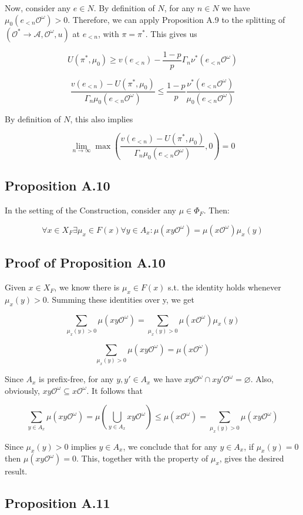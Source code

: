 \documentclass[a4paper]{article}
\newcommand{\Act}{\mathcal{A}}
\newcommand{\Obs}{\mathcal{O}}
\newcommand{\ObsO}{\Obs^\omega}
\newcommand{\Pol}{\Obs^* \rightarrow \Act}
\begin{document}
Now, consider any ${e \in N}$. By definition of ${N}$, for any ${n \in N}$ we have ${\mu_0(e_{<n}\ObsO) > 0}$. Therefore, we can apply Proposition A.9 to the splitting of ${(\Pol,\ObsO,u)}$ at ${e_{<n}}$, with ${\pi = \pi^*}$. This gives us

$$U(\pi^*,\mu_0) \geq v(e_{<n})-\frac{1-p}{p} \Gamma_n \nu^*(e_{<n}\ObsO)$$

$$\frac{v(e_{<n}) - U(\pi^*,\mu_0)}{\Gamma_n\mu_0(e_{<n}\ObsO)} \leq \frac{1-p}{p} \frac{\nu^*(e_{<n}\ObsO)}{\mu_0(e_{<n}\ObsO)}$$

By definition of ${N}$, this also implies

$$\lim_{n \rightarrow \infty} \max(\frac{v(e_{<n}) - U(\pi^*,\mu_0)}{\Gamma_n \mu_0(e_{<n}\ObsO)},0) = 0 $$

\subsection{Proposition A.10}

In the setting of the Construction, consider any ${\mu \in \Phi_F}$. Then:

$$\forall x \in X_F \exists \mu_x \in F(x) \forall y \in A_x: \mu(xy\ObsO) = \mu(x\ObsO) \mu_x(y)$$

\subsection{Proof of Proposition A.10}

Given ${x \in X_F}$, we know there is ${\mu_x \in F(x)}$ s.t. the identity holds whenever ${\mu_x(y) > 0}$. Summing these identities over y, we get

$$\sum_{\mu_x(y) > 0} \mu(xy\ObsO) = \sum_{\mu_x(y) > 0} \mu(x\ObsO) \mu_x(y)$$

$$\sum_{\mu_x(y) > 0} \mu(xy\ObsO) = \mu(x\ObsO)$$

Since ${A_x}$ is prefix-free, for any ${y,y' \in A_x}$ we have ${xy\ObsO \cap xy'\ObsO = \varnothing}$. Also, obviously, ${xy\ObsO \subseteq x\ObsO}$. It follows that

$$\sum_{y \in A_x} \mu(xy\ObsO) = \mu(\bigcup_{y \in A_x} xy\ObsO) \leq \mu(x\ObsO) = \sum_{\mu_x(y) > 0} \mu(xy\ObsO)$$

Since ${\mu_x(y) > 0}$ implies ${y \in A_x}$, we conclude that for any ${y \in A_x}$, if ${\mu_x(y) = 0}$ then ${\mu(xy\ObsO)=0}$. This, together with the property of ${\mu_x}$, gives the desired result.

\subsection{Proposition A.11}
\end{document}

